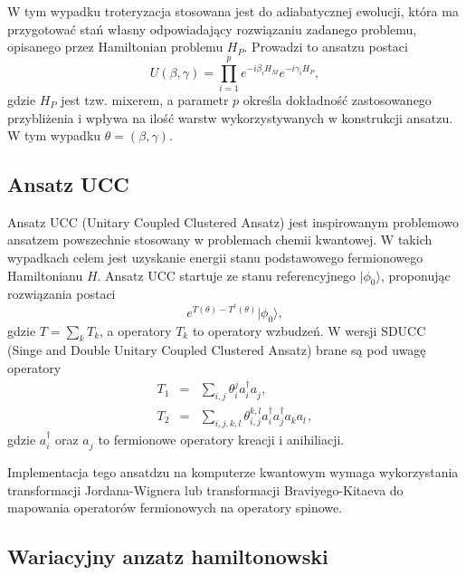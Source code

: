 \documentclass[a4paper,11pt]{article}
\newcommand{\ket}[1]{| #1 \rangle}
\begin{document}
W tym wypadku troteryzacja stosowana jest do adiabatycznej ewolucji, która ma przygotować stań własny odpowiadający rozwiązaniu zadanego problemu, opisanego przez Hamiltonian problemu $H_P$. Prowadzi to ansatzu postaci
\begin{equation}
	U(\beta,\gamma)  = \prod_{i=1}^{p} e^{-i\beta_i H_M} e^{-i\gamma_i H_P},
\end{equation}
gdzie $H_P$ jest tzw. mixerem, a parametr $p$ określa dokładność zastosowanego przybliżenia i wpływa na ilość warstw wykorzystywanych w konstrukcji ansatzu. W tym wypadku $\theta = (\beta,\gamma)$.

\subsection{Ansatz UCC}

Ansatz UCC (Unitary Coupled Clustered Ansatz) jest inspirowanym problemowo ansatzem powszechnie stosowany w problemach chemii kwantowej. W takich wypadkach celem jest uzyskanie energii stanu podstawowego fermionowego  Hamiltonianu $H$. Ansatz UCC startuje ze stanu referencyjnego $\ket{\phi_0}$, proponując rozwiązania postaci 
\begin{equation}
	e^{T(\theta)-T^\dagger(\theta)}\ket{\phi_0},
\end{equation}
gdzie $T = \sum_k T_k$, a operatory $T_k$ to operatory wzbudzeń. W wersji SDUCC (Singe and Double Unitary Coupled Clustered Ansatz) brane są pod uwagę operatory
\begin{eqnarray}
	T_1 &=& \sum_{i,j} \theta_i^ja^\dagger_i a^{\phantom\dagger}_j,\\
	T_2 &=& \sum_{i,j,k,l} \theta_{i,j}^{k,l}a^\dagger_i a^\dagger_j a^{\phantom\dagger}_k a^{\phantom\dagger}_l,
\end{eqnarray}
gdzie $a^{\dagger}_i$ oraz $a^{\phantom\dagger}_j$ to fermionowe operatory kreacji i anihiliacji.

Implementacja tego ansatdzu na komputerze kwantowym wymaga wykorzystania transformacji Jordana-Wignera lub transformacji Braviyego-Kitaeva do mapowania operatorów fermionowych na operatory spinowe.

\subsection{Wariacyjny anzatz hamiltonowski}
\end{document}
